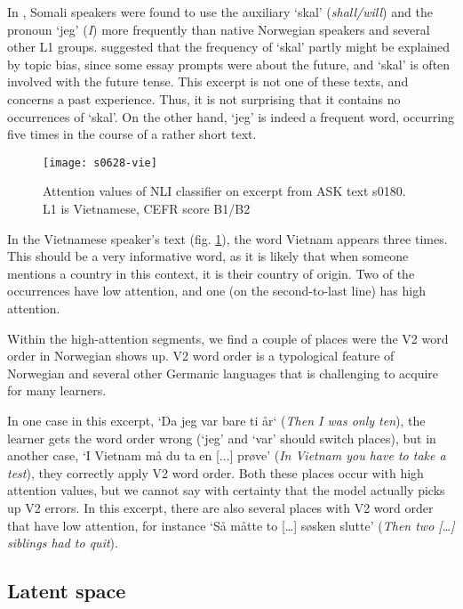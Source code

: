 In \textcite{pepper2012}, Somali speakers were found to use the auxiliary
`skal' (\emph{shall/will}) and the pronoun `jeg' (\emph{I}) more frequently
than native Norwegian speakers and several other L1 groups.
\citeauthor{pepper2012} suggested that the frequency of `skal' partly might
be explained by topic bias, since some essay prompts were about the future,
and `skal' is often involved with the future tense. This excerpt is not one of
these texts, and concerns a past experience. Thus, it is not surprising that
it contains no occurrences of `skal'. On the other hand, `jeg' is indeed a
frequent word, occurring five times in the course of a rather short text.

\begin{figure}
  \centering
  \texttt{[image: s0628-vie]}
  \caption[Attention in a text by a Vietnamese speaker]{
    Attention values of NLI classifier on excerpt from ASK text s0180. L1 is
    Vietnamese, CEFR score B1/B2
  }
  \label{fig:vie-attention}
\end{figure}

In the Vietnamese speaker's text (fig. \ref{fig:vie-attention}), the word
Vietnam appears three times. This should be a very informative word, as it is
likely that when someone mentions a country in this context, it is their
country of origin. Two of the occurrences have low attention, and one (on the
second-to-last line) has high attention.

Within the high-attention segments, we find a couple of places were the V2
word order in Norwegian shows up. V2 word order is a typological feature of
Norwegian and several other Germanic languages that is challenging to acquire
for many learners.

In one case in this excerpt, `Da jeg var bare ti år` (\emph{Then I was only
ten}), the learner gets the word order wrong (`jeg' and `var' should switch
places), but in another case, `I Vietnam må du ta en [...] prøve' (\emph{In
Vietnam you have to take a test}), they correctly apply V2 word order. Both
these places occur with high attention values, but we cannot say with
certainty that the model actually picks up V2 errors. In this excerpt, there
are also several places with V2 word order that have low attention, for
instance `Så måtte to […] søsken slutte' (\emph{Then two […] siblings had to
quit}). 


\subsection{Latent space}

